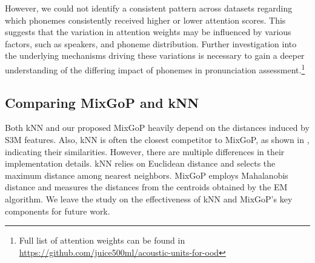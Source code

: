 However, we could not identify a consistent pattern across datasets regarding which phonemes consistently received higher or lower attention scores. 
This suggests that the variation in attention weights may be influenced by various factors, such as speakers, and phoneme distribution.
Further investigation into the underlying mechanisms driving these variations is necessary to gain a deeper understanding of the differing impact of phonemes in pronunciation assessment.\footnote{Full list of attention weights can be found in \url{https://github.com/juice500ml/acoustic-units-for-ood}}


\subsection{Comparing MixGoP and kNN}\label{subsec:gop_vs_knn}
Both kNN and our proposed MixGoP heavily depend on the distances induced by S3M features.
Also, kNN is often the closest competitor to MixGoP, as shown in , indicating their similarities.
However, there are multiple differences in their implementation details.
kNN relies on Euclidean distance and selects the maximum distance among nearest neighbors.
MixGoP employs Mahalanobis distance and measures the distances from the centroids obtained by the EM algorithm.
We leave the study on the effectiveness of kNN and MixGoP's key components for future work.







